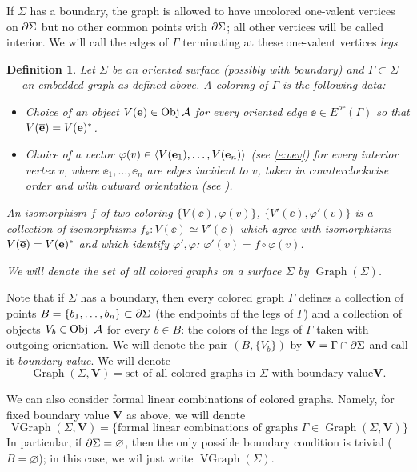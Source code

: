\documentclass{amsart}
\newtheorem{defn}[thm]{Definition}
\DeclareMathOperator{\Obj}{Obj}
\DeclareMathOperator{\Gr}{Graph}
\DeclareMathOperator{\VGr}{VGraph}
\newcommand{\VV}{\mathbf{V}}       %
\newcommand{\Ga}{\Gamma}
\newcommand{\ph}{\varphi}
\newcommand{\Si}{\Sigma}
\begin{document}
If $\Si$ has a boundary, the graph is allowed to have uncolored one-valent
vertices on $\del \Si$ but no other common points with $\del \Si$; all
other  vertices will  be called interior.  We will  call the edges of $\Ga$
terminating at these  one-valent vertices {\em legs}.   
\begin{defn}\label{d:coloring} Let $\Si$ be an oriented surface
(possibly with boundary) and $\Ga\subset \Si$ --- an embedded graph as
defined above.  A {\em coloring} of $\Ga$ is the
following data:

  \begin{itemize}
    \item Choice of an object $V(\ee)\in \Obj \A$ for every oriented edge
        $\ee\in E^{or}(\Ga)$ so that $V(\overline{\mathbf{e}})=V(\mathbf{e})^*$.
    \item Choice of a vector $\ph(v)\in \<V(\ee_1),\dots,V(\ee_n)\>$ 
      (see \eqref{e:vev})  for    every interior vertex $v$, where 
      $\ee_1, \dots, \ee_n$ are edges incident to $v$, taken in counterclockwise 
      order and with outward orientation (see ). 
\end{itemize}

An {\em isomorphism} $f$ of two coloring $\{V(\ee), \ph(v)\}$, $\{V'(\ee), \ph'(v)\}$ is a collection of isomorphisms $f_\ee\colon V(\ee)\simeq 
V'(\ee)$ which  agree  with isomorphisms $V(\overline{\mathbf{e}})=V(\mathbf{e})^*$ and which 
identify $\ph', \ph$:  $\ph'(v)=f\circ\ph(v)$. 

We will denote the set of all colored graphs on a surface $\Si$ by
$\Gr(\Si)$.
\end{defn}


Note that if $\Si$ has a boundary, then every colored graph $\Ga$ defines
a collection of points $B=\{b_1,\dots, b_n\}\subset \del \Si$ (the
endpoints of the legs of $\Ga$) and a collection of objects $V_b\in \Obj\
\A$ for every $b \in B$: the colors of the legs of $\Ga$ taken with
outgoing orientation. We will denote the pair $(B, \{V_b\})$ by
$\VV=\Ga\cap \del\Si$ and call it {\em boundary value}. We will denote  
$$
\Gr(\Si, \VV)=\text{set of all colored graphs in $\Si$ with boundary value
} \VV.
$$ 


We can also consider formal linear combinations of colored graphs. Namely,
for fixed boundary value $\VV$ as above, we will denote 
\begin{equation}\label{e:vgr}
\VGr(\Si,\VV)=\{\text{formal linear combinations of graphs }\Ga\in
\Gr(\Si,\VV)\}
\end{equation}
In particular, if $\del \Si=\varnothing$, then the only possible boundary
condition is trivial ($B=\varnothing$); in this case, we wil just write
$\VGr(\Si)$. 
\end{document}

